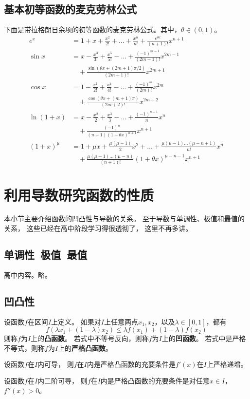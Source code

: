\subsection{基本初等函数的麦克劳林公式}
下面是带拉格朗日余项的初等函数的麦克劳林公式。其中，$\theta\in (0,1)$。
\begin{align*}
  e^x &= 1+x+\frac{x^2}{2!}+\dots+\frac{x^n}{n!}
    + \frac{e^{\theta x}}{(n+1)!}x^{n+1} \\
  \sin x &= x - \frac{x^3}{3!} + \frac{x^5}{5!} -\dots
    + \frac{(-1)^{m-1}}{(2m-1)!}x^{2m-1}\\
    &\quad + \frac{\sin(\theta x + (2m+1)\pi / 2)}{(2m+1)!}x^{2m+1}\\
  \cos x &= 1 - \frac{x^2}{2!} + \frac{x^4}{4!} -\dots
    + \frac{(-1)^{m}}{(2m)!}x^{2m}\\
    &\quad + \frac{\cos(\theta x + (m+1)\pi)}{(2m+2)!}x^{2m+2} \\
  \ln(1+x) &= x -\frac{x^2}{2} + \frac{x^3}{3}-\dots
    + \frac{(-1)^{n-1}}{n}x^n \\
    &\quad + \frac{(-1)^{n}}{(n+1)(1+\theta x)^{n+1}}x^{n+1} \\
  (1+x)^{\mu} &= 1 + \mu x + \frac{\mu(\mu-1)}{2}x^2+\dots
    + \frac{\mu(\mu-1)\dots(\mu-n+1)}{n!}x^n \\
    &\quad + \frac{\mu(\mu-1)\dots(\mu-n)}{(n+1)!}
    (1+\theta x)^{\mu-n-1}x^{n+1}
\end{align*}

\section{利用导数研究函数的性质}
本小节主要介绍函数的凹凸性与导数的关系。
至于导数与单调性、极值和最值的关系，
这些已经在高中阶段学习得很透彻了，
这里不再多讲。

\subsection{单调性\ 极值\ 最值}
高中内容。略。

\subsection{凹凸性}
\begin{definition}[凸函数]
  设函数$f$在区间$I$上定义。
  如果对$I$上任意两点$x_1,x_2$，以及$\lambda\in[0,1]$，都有
  \begin{displaymath}
    f(\lambda x_1 + (1-\lambda)x_2)\le
    \lambda f(x_1) + (1-\lambda)f(x_2)
  \end{displaymath}
  则称$f$为$I$上的\textbf{凸函数}。
  若式中不等号反向，则称$f$为$I$上的\textbf{凹函数}。
  若式中是严格不等式，则称$f$为$I$上的\textbf{严格凸函数}。
\end{definition}

\begin{theorem}
  设函数$f$在$I$内可导，
  则$f$在$I$内是严格凸函数的充要条件是$f'(x)$在$I$上严格递增。
\end{theorem}

\begin{theorem}
  设函数$f$在$I$内二阶可导，
  则$f$在$I$内是严格凸函数的充要条件是对任意$x\in I$，$f''(x)>0$。
\end{theorem}
